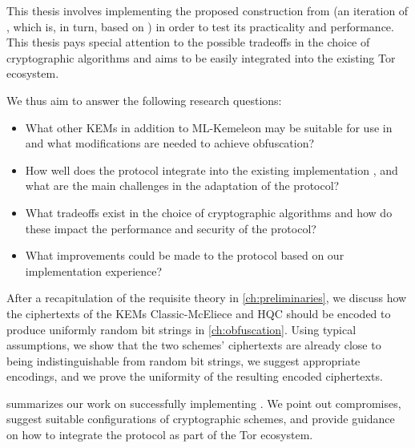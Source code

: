 This thesis involves implementing the proposed \drivel{} construction from \cite{EPRINT:GRSV25} (an iteration of \pqobfs{}, which is, in turn, based on \obfsfour{}) in order to test its practicality and performance.
This thesis pays special attention to the possible tradeoffs in the choice of cryptographic algorithms and aims to be easily integrated into the existing Tor ecosystem.

We thus aim to answer the following research questions:
\begin{itemize}
    \item What other KEMs in addition to ML-Kemeleon may be suitable for use in \drivel{} and what modifications are needed to achieve obfuscation?
    
    \item How well does the \drivel{} protocol integrate into the existing \obfsfour{} implementation \cite{lyrebird}, and what are the main challenges in the adaptation of the protocol?
    
    \item What tradeoffs exist in the choice of cryptographic algorithms and how do these impact the performance and security of the protocol?
    
    \item What improvements could be made to the \drivel{} protocol based on our implementation experience?
\end{itemize}

After a recapitulation of the requisite theory in \cref{ch:preliminaries}, we discuss how the ciphertexts of the KEMs Classic-McEliece and HQC should be encoded to produce uniformly random bit strings in \cref{ch:obfuscation}. Using typical assumptions, we show that the two schemes' ciphertexts are already close to being indistinguishable from random bit strings, we suggest appropriate encodings, and we prove the uniformity of the resulting encoded ciphertexts.

 summarizes our work on successfully implementing \drivel{}. We point out compromises, suggest suitable configurations of cryptographic schemes, and provide guidance on how to integrate the \drivel{} protocol as part of the Tor ecosystem.

